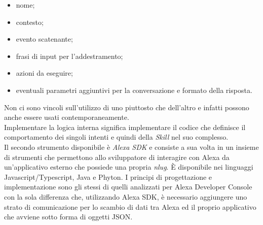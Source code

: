 		\begin{itemize}
			\item nome;
			\item contesto;
			\item evento scatenante;
			\item frasi di input per l'addestramento;
			\item azioni da eseguire;
			\item eventuali parametri aggiuntivi per la conversazione e formato della risposta.
		\end{itemize}
		Non ci sono vincoli sull'utilizzo di uno piuttosto che dell'altro e infatti possono anche essere usati contemporaneamente. \\
		Implementare la logica interna significa implementare il codice che definisce il comportamento dei singoli intenti e quindi della \emph{Skill} nel suo complesso. \\
		Il secondo strumento disponibile è \emph{Alexa SDK} e consiste a sua volta in un insieme di strumenti che permettono allo sviluppatore di interagire con Alexa da un'applicativo esterno che possiede una propria \emph{\gls{nlug}}. È disponibile nei linguaggi Javascript/Typescript, Java e Phyton. I principi di progettazione e implementazione sono gli stessi di quelli analizzati per Alexa Developer Console con la sola differenza che, utilizzando Alexa SDK, è necessario aggiungere uno strato di comunicazione per lo scambio di dati tra Alexa ed il proprio applicativo che avviene sotto forma di oggetti JSON.

